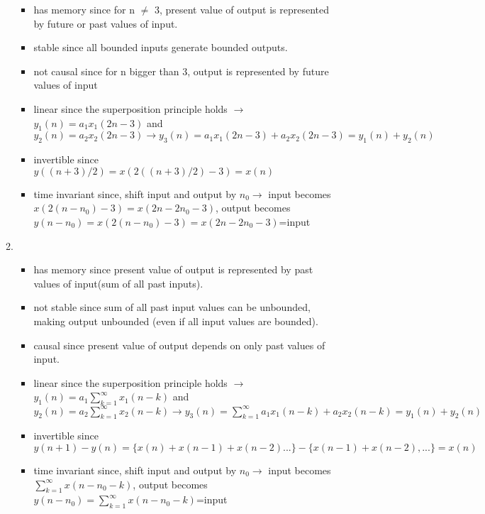\documentclass[10pt,a4paper, margin=1in]{article}
\begin{document}
\begin{enumerate}
\begin{enumerate}
        \begin{itemize}
            \item has memory since for n $\neq$ 3, present value of output is represented by future or past values of input.
            \item stable since all bounded inputs generate bounded outputs.
            \item not causal since for n bigger than 3, output is represented by future values of input
            \item linear since the superposition principle holds $ \rightarrow{} $
                $y_1(n)=a_1x_1(2n-3)$ and $y_2(n)=a_2x_2(2n-3) \rightarrow{} y_3(n)=a_1x_1(2n-3)+a_2x_2(2n-3)=y_1(n)+y_2(n)$ 
            \item invertible since $y((n+3)/2)=x(2((n+3)/2)-3)=x(n)$
            \item time invariant since, shift input and output by $n_0 \rightarrow{} $ input becomes $x(2(n-n_0)-3)=x(2n-2n_0-3)$, output becomes $y(n-n_0)=x(2(n-n_0)-3)=x(2n-2n_0-3)$=input
        \end{itemize}
    \item %
        \begin{itemize}
            \item has memory since present value of output is represented by past values of input(sum of all past inputs).
            \item not stable since sum of all past input values can be unbounded, making output unbounded (even if all input values are bounded).
            \item causal since present value of output depends on only past values of input. 
            \item linear since the superposition principle holds $ \rightarrow{} $
                $y_1(n)=a_1 \sum_{k=1}^{\infty}{x_1(n-k)}$ and $y_2(n)=a_2 \sum_{k=1}^{\infty}{x_2(n-k)} \rightarrow{} y_3(n)= \sum_{k=1}^{\infty}{a_1x_1(n-k)+a_2x_2(n-k)}=y_1(n)+y_2(n)$ 
            \item invertible since $y(n+1)-y(n)=\{x(n)+x(n-1)+x(n-2)...\}-\{x(n-1)+x(n-2),...\}=x(n)$
            \item time invariant since, shift input and output by $n_0 \rightarrow{} $ input becomes $\sum_{k=1}^{\infty}{x(n-n_0-k)}$, output becomes $y(n-n_0)= \sum_{k=1}^{\infty}{x(n-n_0-k)}$=input
        \end{itemize}
    \end{enumerate}


\end{enumerate}
\end{document}
